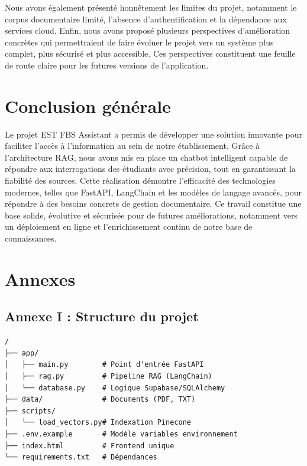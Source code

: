 \documentclass[12pt, a4paper, twoside]{report}
\begin{document}
Nous avons également présenté honnêtement les limites du projet, notamment le corpus documentaire limité, l'absence d'authentification et la dépendance aux services cloud. Enfin, nous avons proposé plusieurs perspectives d'amélioration concrètes qui permettraient de faire évoluer le projet vers un système plus complet, plus sécurisé et plus accessible. Ces perspectives constituent une feuille de route claire pour les futures versions de l'application.
\chapter*{Conclusion générale}

Le projet EST FBS Assistant a permis de développer une solution innovante pour faciliter l'accès à l'information au sein de notre établissement. Grâce à l'architecture RAG, nous avons mis en place un chatbot intelligent capable de répondre aux interrogations des étudiants avec précision, tout en garantissant la fiabilité des sources. Cette réalisation démontre l'efficacité des technologies modernes, telles que FastAPI, LangChain et les modèles de langage avancés, pour répondre à des besoins concrets de gestion documentaire. Ce travail constitue une base solide, évolutive et sécurisée pour de futures améliorations, notamment vers un déploiement en ligne et l'enrichissement continu de notre base de connaissances.

\chapter*{Annexes}

\section*{Annexe I : Structure du projet}
\begin{verbatim}
/
├── app/
│   ├── main.py        # Point d'entrée FastAPI
│   ├── rag.py         # Pipeline RAG (LangChain)
│   └── database.py    # Logique Supabase/SQLAlchemy
├── data/              # Documents (PDF, TXT)
├── scripts/
│   └── load_vectors.py# Indexation Pinecone
├── .env.example       # Modèle variables environnement
├── index.html         # Frontend unique
└── requirements.txt   # Dépendances
\end{verbatim}
\newpage
\end{document}
